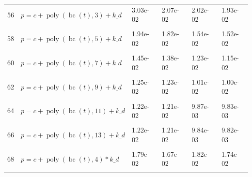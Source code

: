 \documentclass[12pt,a4paper]{article}
\DeclareMathOperator{\bc}{bc}
\DeclareMathOperator{\poly}{poly}
\begin{document}
\begin{longtable}[t]{ll>{\raggedleft\arraybackslash}p{2cm}>{\raggedleft\arraybackslash}p{2cm}>{\raggedleft\arraybackslash}p{2cm}>{\raggedleft\arraybackslash}p{2cm}}
56 & $p = c + \poly\left( \bc(t), 3 \right) + k\_d$ & 3.03e-02 & 2.07e-02 & 2.02e-02 & 1.93e-02\\
\cellcolor{gray!6}{57} & \cellcolor{gray!6}{$p = c + \poly\left( \bc(t), 4 \right) + k\_d$} & \cellcolor{gray!6}{2.23e-02} & \cellcolor{gray!6}{2.10e-02} & \cellcolor{gray!6}{2.11e-02} & \cellcolor{gray!6}{2.05e-02}\\
58 & $p = c + \poly\left( \bc(t), 5 \right) + k\_d$ & 1.94e-02 & 1.82e-02 & 1.54e-02 & 1.52e-02\\
\cellcolor{gray!6}{59} & \cellcolor{gray!6}{$p = c + \poly\left( \bc(t), 6 \right) + k\_d$} & \cellcolor{gray!6}{1.56e-02} & \cellcolor{gray!6}{1.48e-02} & \cellcolor{gray!6}{1.18e-02} & \cellcolor{gray!6}{1.18e-02}\\
60 & $p = c + \poly\left( \bc(t), 7 \right) + k\_d$ & 1.45e-02 & 1.38e-02 & 1.23e-02 & 1.15e-02\\
\cellcolor{gray!6}{61} & \cellcolor{gray!6}{$p = c + \poly\left( \bc(t), 8 \right) + k\_d$} & \cellcolor{gray!6}{1.26e-02} & \cellcolor{gray!6}{1.24e-02} & \cellcolor{gray!6}{1.00e-02} & \cellcolor{gray!6}{1.00e-02}\\
62 & $p = c + \poly\left( \bc(t), 9 \right) + k\_d$ & 1.25e-02 & 1.23e-02 & 1.01e-02 & 1.00e-02\\
\cellcolor{gray!6}{63} & \cellcolor{gray!6}{$p = c + \poly\left( \bc(t), 10 \right) + k\_d$} & \cellcolor{gray!6}{1.24e-02} & \cellcolor{gray!6}{1.23e-02} & \cellcolor{gray!6}{9.95e-03} & \cellcolor{gray!6}{9.92e-03}\\
64 & $p = c + \poly\left( \bc(t), 11 \right) + k\_d$ & 1.22e-02 & 1.21e-02 & 9.87e-03 & 9.83e-03\\
\cellcolor{gray!6}{65} & \cellcolor{gray!6}{$p = c + \poly\left( \bc(t), 12 \right) + k\_d$} & \cellcolor{gray!6}{1.22e-02} & \cellcolor{gray!6}{1.21e-02} & \cellcolor{gray!6}{9.85e-03} & \cellcolor{gray!6}{9.82e-03}\\
66 & $p = c + \poly\left( \bc(t), 13 \right) + k\_d$ & 1.22e-02 & 1.21e-02 & 9.84e-03 & 9.82e-03\\
\cellcolor{gray!6}{67} & \cellcolor{gray!6}{$p = c + \poly\left( \bc(t), 3 \right) * k\_d$} & \cellcolor{gray!6}{2.73e-02} & \cellcolor{gray!6}{1.69e-02} & \cellcolor{gray!6}{1.76e-02} & \cellcolor{gray!6}{1.65e-02}\\
68 & $p = c + \poly\left( \bc(t), 4 \right) * k\_d$ & 1.79e-02 & 1.67e-02 & 1.82e-02 & 1.74e-02\\
\cellcolor{gray!6}{69} & \cellcolor{gray!6}{$p = c + \poly\left( \bc(t), 5 \right) * k\_d$} & \cellcolor{gray!6}{1.31e-02} & \cellcolor{gray!6}{1.29e-02} & \cellcolor{gray!6}{1.04e-02} & \cellcolor{gray!6}{1.04e-02}\\

\end{longtable}
\end{document}
